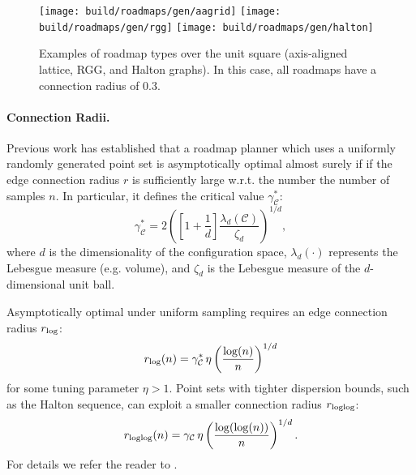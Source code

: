 \begin{figure}
   \centering
   \texttt{[image: build/roadmaps/gen/aagrid]}
   \texttt{[image: build/roadmaps/gen/rgg]}
   \texttt{[image: build/roadmaps/gen/halton]}
   \caption{Examples of roadmap types over the unit square
      (axis-aligned lattice, RGG, and Halton graphs).
      In this case, all roadmaps have a connection radius of 0.3.}
\end{figure}

\paragraph{Connection Radii.}
Previous work \citep{karaman2011samplingoptimal} has established
that a roadmap planner which uses a uniformly randomly generated
point set is asymptotically optimal almost surely
if if the edge connection radius $r$ is sufficiently large w.r.t.
the number the number of samples $n$.
In particular,
it defines the critical value $\gamma^*_{\mathcal{C}}$:
\begin{equation}
   \gamma^*_{\mathcal{C}}
      = 2 \left( \left[ 1 + \frac{1}{d} \right]
         \frac{\lambda_d(\mathcal{C})}{\zeta_d} \right)^{1/d},
\end{equation}
where $d$ is the dimensionality of the configuration space,
$\lambda_d(\cdot)$ represents the Lebesgue measure (e.g. volume),
and $\zeta_d$ is the Lebesgue measure of the $d$-dimensional unit ball.

Asymptotically optimal under uniform sampling requires
an edge connection radius $r_{\mbox{\scriptsize log}}$:
\begin{equation}
   r_{\mbox{\scriptsize log}}(n) =  \gamma^*_{\mathcal{C}} \, \eta
      \left( \frac{\log(n)}{n} \right)^{1/d}
\end{equation}
for some tuning parameter $\eta > 1$.
Point sets with tighter dispersion bounds,
such as the Halton sequence,
can exploit a smaller connection radius $r_{\mbox{\scriptsize loglog}}$:
\begin{equation}
   r_{\mbox{\scriptsize loglog}}(n) = \gamma_{\mathcal{C}} \, \eta
      \left( \frac{\log(\log(n))}{n} \right)^{1/d}.
\end{equation}
For details we refer the reader
to \citep{janson2015deterministicsampling}.

